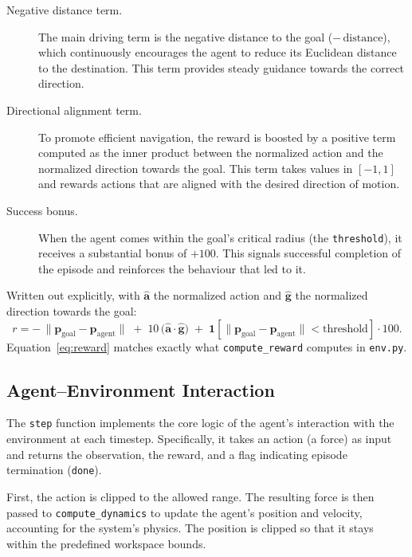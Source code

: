 \documentclass[11pt]{article}
\begin{document}
\begin{description}
  \item[Negative distance term.] \sloppy The main driving term is the negative distance to the goal
  ($-\,\text{distance}$), which continuously encourages the agent to reduce its Euclidean distance to
  the destination. This term provides steady guidance towards the correct direction.
  \item[Directional alignment term.] To promote efficient navigation, the reward is boosted by a positive
  term computed as the inner product between the normalized action and the normalized direction towards
  the goal. This term takes values in $[-1,1]$ and rewards actions that are aligned with the desired
  direction of motion.
  \item[Success bonus.] When the agent comes within the goal's critical radius (the \texttt{threshold}),
  it receives a substantial bonus of $+100$. This signals successful completion of the episode and
  reinforces the behaviour that led to it.
\end{description}

Written out explicitly, with $\hat{\mathbf{a}}$ the normalized action and $\hat{\mathbf{g}}$ the
normalized direction towards the goal:
\begin{equation}
r = -\,\lVert \mathbf{p}_{\text{goal}} - \mathbf{p}_{\text{agent}} \rVert
    \;+\; 10\,\bigl(\hat{\mathbf{a}}\cdot\hat{\mathbf{g}}\bigr)
    \;+\; \mathbf{1}\!\left[\lVert \mathbf{p}_{\text{goal}} - \mathbf{p}_{\text{agent}} \rVert < \text{threshold}\right]\cdot 100 .
\label{eq:reward}
\end{equation}
Equation~\eqref{eq:reward} matches exactly what \texttt{compute\_reward} computes in \texttt{env.py}.

\subsection{Agent--Environment Interaction}

The \texttt{step} function implements the core logic of the agent's interaction with the environment at
each timestep. Specifically, it takes an action (a force) as input and returns the observation, the
reward, and a flag indicating episode termination (\texttt{done}).

First, the action is clipped to the allowed range. The resulting force is then passed to
\texttt{compute\_dynamics} to update the agent's position and velocity, accounting for the system's
physics. The position is clipped so that it stays within the predefined workspace bounds.
\end{document}
